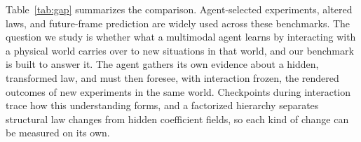 Table~\ref{tab:gap} summarizes the comparison. Agent-selected experiments, altered laws, and future-frame prediction are widely used across these benchmarks. The question we study is whether what a multimodal agent learns by interacting with a physical world carries over to new situations in that world, and our benchmark is built to answer it. The agent gathers its own evidence about a hidden, transformed law, and must then foresee, with interaction frozen, the rendered outcomes of new experiments in the same world. Checkpoints during interaction trace how this understanding forms, and a factorized hierarchy separates structural law changes from hidden coefficient fields, so each kind of change can be measured on its own.
